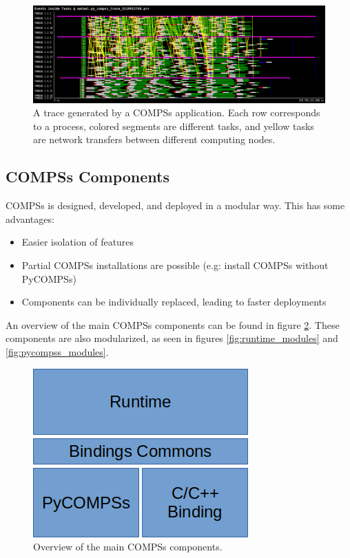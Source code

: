 \begin{figure}[ht!]
\centering
\includegraphics[scale = 0.3]{figures/matmul_trace.png}
\caption{A trace generated by a COMPSs application. Each row corresponds to a process, colored segments are different tasks, and yellow tasks are network transfers between different computing nodes.}
\label{fig:trace_example}
\end{figure}



\subsection{COMPSs Components}
\label{subsec:compss_components}
COMPSs is designed, developed, and deployed in a modular way. This has some advantages:
\begin{itemize} 
\item Easier isolation of features
\item Partial COMPSs installations are possible (e.g: install COMPSs without PyCOMPSs)
\item Components can be individually replaced, leading to faster deployments
\end{itemize}
An overview of the main COMPSs components can be found in figure \ref{fig:compss_modules}. These components are also modularized, as seen in figures \ref{fig:runtime_modules} and \ref{fig:pycompss_modules}.
\begin{figure}
\centering
\includegraphics{figures/compss_modules.png}
\caption{Overview of the main COMPSs components.}
\label{fig:compss_modules}
\end{figure}

